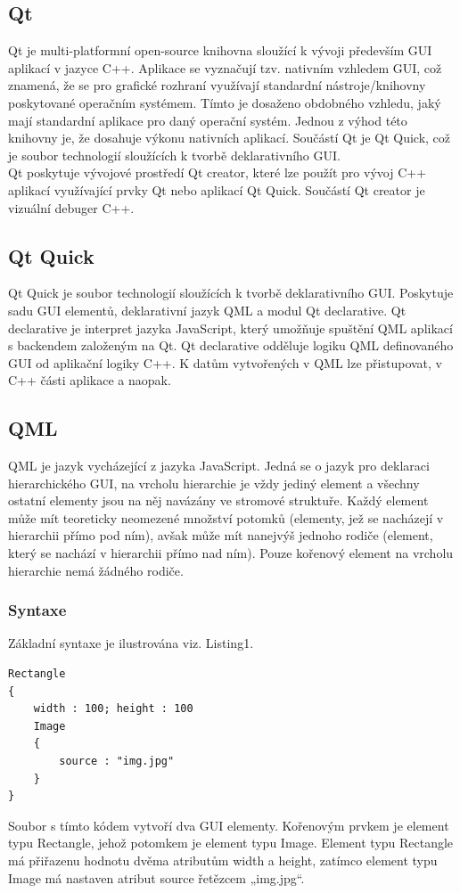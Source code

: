 \documentclass[report,11pt]{elsarticle}
\begin{document}
\subsection{Qt}
Qt je multi-platformní open-source knihovna sloužící k vývoji především GUI aplikací v jazyce C++. Aplikace se vyznačují tzv. nativním vzhledem GUI, což znamená, že se pro grafické rozhraní využívají standardní nástroje/knihovny poskytované operačním systémem. Tímto je dosaženo obdobného vzhledu, jaký mají standardní aplikace pro daný operační systém. Jednou z výhod této knihovny je, že dosahuje výkonu nativních aplikací. Součástí Qt je Qt Quick, což je soubor technologií sloužících k tvorbě deklarativního GUI.\\
Qt poskytuje vývojové prostředí Qt creator, které lze použít pro vývoj C++ aplikací využívající prvky Qt nebo aplikací Qt Quick. Součástí Qt creator je vizuální debuger C++.

\subsection{Qt Quick}
Qt Quick je soubor technologií sloužících k tvorbě deklarativního GUI. Poskytuje sadu GUI elementů, deklarativní jazyk QML a modul Qt declarative. Qt declarative je interpret jazyka JavaScript, který umožňuje spuštění QML aplikací s backendem založeným na Qt. Qt declarative odděluje logiku QML definovaného GUI od aplikační logiky C++. K datům vytvořených v QML lze přistupovat, v C++ části aplikace a naopak.

\subsection{QML}
QML je jazyk vycházející z jazyka JavaScript. Jedná se o jazyk pro deklaraci hierarchického GUI, na vrcholu hierarchie je vždy jediný element a všechny ostatní elementy jsou na něj navázány ve stromové struktuře. Každý element může mít teoreticky neomezené množství potomků (elementy, jež se nacházejí v hierarchii přímo pod ním), avšak může mít nanejvýš jednoho rodiče (element, který se nachází v hierarchii přímo nad ním). Pouze kořenový element na vrcholu hierarchie nemá žádného rodiče.


\subsubsection{Syntaxe}
Základní syntaxe je ilustrována viz. Listing1.
\begin{lstlisting}[frame=single,caption=Tvorba dvou jednoduchých elementů pomocí jazyka QML.,label=Tvorba dvou jednoduchých elementů pomocí jazyka QML.]
Rectangle
{
	width : 100; height : 100
	Image
	{
		source : "img.jpg"
	}
}
\end{lstlisting}
Soubor s tímto kódem vytvoří dva GUI elementy. Kořenovým prvkem je element typu Rectangle, jehož potomkem je element typu Image. Element typu Rectangle má přiřazenu hodnotu dvěma atributům width a height, zatímco element typu Image má nastaven atribut source řetězcem „img.jpg“.
\end{document}

